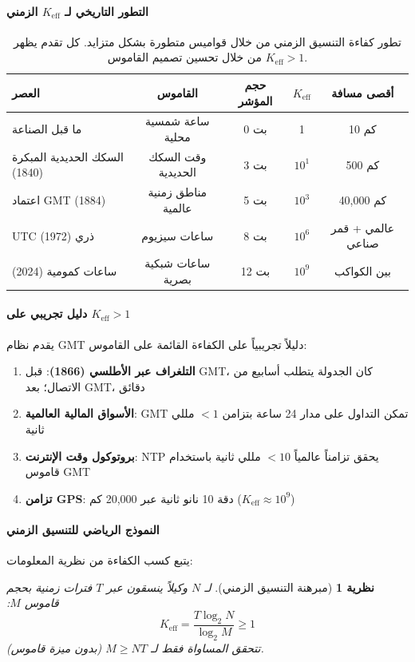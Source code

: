\documentclass[11pt,a4paper]{article}
\newtheorem{theorem}{نظرية}
\begin{document}
	\paragraph{التطور التاريخي لـ $K_{\mathrm{eff}}$ الزمني}
	\begin{table}[htbp]
		\centering
		\begin{english}
			\begin{tabular}{lcccc}
				\toprule
				\textbf{العصر} & \textbf{القاموس} & \textbf{حجم المؤشر} & \textbf{$K_{\mathrm{eff}}$} & \textbf{أقصى مسافة} \\
				\midrule
				ما قبل الصناعة & ساعة شمسية محلية & 0 بت & 1 & 10 كم \\
				السكك الحديدية المبكرة (1840) & وقت السكك الحديدية & 3 بت & $10^1$ & 500 كم \\
				اعتماد GMT (1884) & مناطق زمنية عالمية & 5 بت & $10^3$ & 40,000 كم \\
				UTC ذري (1972) & ساعات سيزيوم & 8 بت & $10^6$ & عالمي + قمر صناعي \\
				ساعات كمومية (2024) & ساعات شبكية بصرية & 12 بت & $10^9$ & بين الكواكب \\
				\bottomrule
			\end{tabular}
		\end{english}
		\caption{تطور كفاءة التنسيق الزمني من خلال قواميس متطورة بشكل متزايد. كل تقدم يظهر $K_{\mathrm{eff}} > 1$ من خلال تحسين تصميم القاموس.}
		\label{tab:time-keff-evolution}
	\end{table}
	
	\paragraph{دليل تجريبي على $K_{\mathrm{eff}} > 1$}
	يقدم نظام GMT دليلاً تجريبياً على الكفاءة القائمة على القاموس:
	\begin{enumerate}
		\item \textbf{التلغراف عبر الأطلسي (1866)}: قبل GMT، كان الجدولة يتطلب أسابيع من الاتصال؛ بعد GMT، دقائق
		\item \textbf{الأسواق المالية العالمية}: GMT تمكن التداول على مدار 24 ساعة بتزامن $<1$ مللي ثانية
		\item \textbf{بروتوكول وقت الإنترنت}: NTP يحقق تزامناً عالمياً $<10$ مللي ثانية باستخدام قاموس GMT
		\item \textbf{تزامن GPS}: دقة 10 نانو ثانية عبر 20,000 كم ($K_{\mathrm{eff}} \approx 10^9$)
	\end{enumerate}
	
	\paragraph{النموذج الرياضي للتنسيق الزمني}
	يتبع كسب الكفاءة من نظرية المعلومات:
	\begin{theorem}[مبرهنة التنسيق الزمني]
		لـ $N$ وكيلاً ينسقون عبر $T$ فترات زمنية بحجم قاموس $M$:
		\begin{equation}
			K_{\mathrm{eff}} = \frac{T \log_2 N}{\log_2 M} \geq 1
		\end{equation}
		تتحقق المساواة فقط لـ $M \geq NT$ (بدون ميزة قاموس).
	\end{theorem}
	
\end{document}
